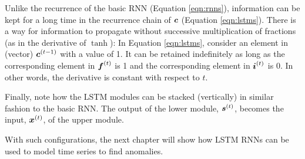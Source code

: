 



Unlike the recurrence of the basic RNN (Equation \ref{eqn:rnns}), information can be kept for a long time in the recurrence chain of $\boldsymbol{c}$ (Equation \ref{eqn:lstms}). 
%
There is a way for information to propagate without successive multiplication of fractions (as in the derivative of $\tanh$):
%
In Equation \ref{eqn:lstms}, consider an element in (vector) $\boldsymbol{c}\sp{(t-1)}$ with a value of 1.
%
It can be retained indefinitely as long as the corresponding element in $\boldsymbol{f}\sp{(t)}$ is 1 and the corresponding element in $\boldsymbol{i}\sp{(t)}$ is 0.
%
In other words, the derivative is constant with respect to $t$.

Finally, note how the LSTM modules can be stacked (vertically) in similar fashion to the basic RNN.
%
The output of the lower module, $\boldsymbol{s}\sp{(t)}$, becomes the input, $\boldsymbol{x}\sp{(t)}$, of the upper module.


With such configurations, the next chapter will show how LSTM RNNs can be used to model time series to find anomalies.



